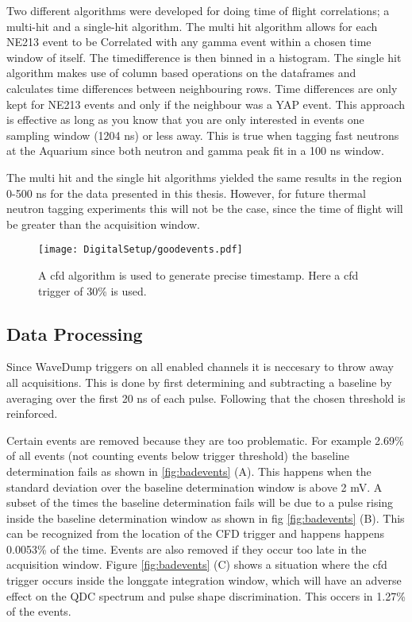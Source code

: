 \documentclass[main.tex]{subfiles}
\begin{document}
Two different algorithms were developed for doing time of flight correlations; a multi-hit and a single-hit algorithm. The multi hit algorithm allows for each NE213 event to be Correlated with any gamma event within a chosen time window of itself. The timedifference is then binned in a histogram. 
The single hit algorithm makes use of column based operations on the dataframes and calculates time differences between neighbouring rows. Time differences are only kept for NE213 events and only if the neighbour was a YAP event. This approach is effective as long as you know that you are only interested in events one sampling window (1204 ns) or less away. This is true when tagging fast neutrons at the Aquarium since both neutron and gamma peak fit in a 100 ns window. 

The multi hit and the single hit algorithms yielded the same results in the region 0-500 ns for the data presented in this thesis. However, for future thermal neutron tagging experiments this will not be the case, since the time of flight will be greater than the acquisition window.
\begin{figure}[ht!]
    \centering
        \texttt{[image: DigitalSetup/goodevents.pdf]}
        \caption{A cfd algorithm is used to generate precise timestamp. Here a cfd trigger of 30\% is used.}
    \label{fig:cfd_trig} 
\end{figure}

\subsection{Data Processing}
Since WaveDump triggers on all enabled channels it is neccesary to throw away all acquisitions. This is done by first determining and subtracting a baseline by averaging over the first 20 ns of each pulse. Following that the chosen threshold is reinforced. 

Certain events are removed because they are too problematic. For example 2.69\% of all events (not counting events below trigger threshold) the baseline determination fails as shown in \ref{fig:badevents} (A). This happens when the standard deviation over the baseline determination window is above 2 mV. 
A subset of the times the baseline determination fails will be due to a pulse rising inside the baseline determination window as shown in fig \ref{fig:badevents} (B). This can be recognized from the location of the CFD trigger and happens happens 0.0053\% of the time. Events are also removed if they occur too late in the acquisition window. Figure \ref{fig:badevents} (C) shows a situation where the cfd trigger occurs inside the longgate integration window, which will have an adverse effect on the QDC spectrum and pulse shape discrimination. This occers in 1.27\% of the events.
\end{document}
